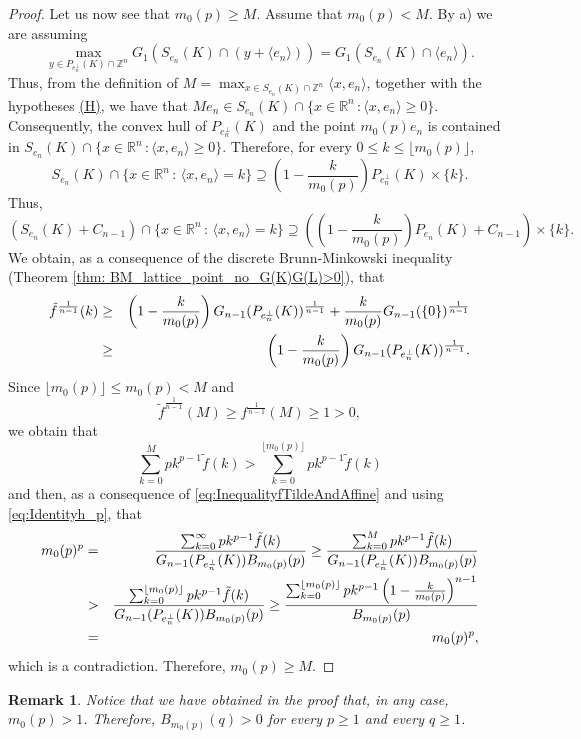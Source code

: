 \documentclass[10pt]{amsart}
\newtheorem{rmk}[thm]{Remark}
\def\R{\mathbb{R}}
\def\Z{\mathbb{Z}}
\numberwithin{equation}{section}
\begin{document}
\begin{proof}
Let us now see that $m_0(p)\geq M$. Assume that $m_0(p)<M$. By a) we are assuming
$$
\max_{y\in P_{e_n^\perp}(K)\cap\Z^n}G_1(S_{e_n}(K)\cap(y+\langle e_n\rangle))=G_1(S_{e_n}(K)\cap\langle e_n\rangle).
$$
Thus, from the definition of $\displaystyle{M=\max_{x\in S_{e_n}(K)\cap\Z^n}\langle x,e_n\rangle}$, together with the hypotheses \hyperlink{(H)}{\textrm{(H)}}, we have that $Me_n\in S_{e_n}(K)\cap\{x\in\R^n\,:\langle x,e_n\rangle\geq0\}$. Consequently, the convex hull of $P_{e_n^\perp}(K)$ and the point $m_0(p)e_n$  is contained in $S_{e_n}(K)\cap\{x\in\R^n\,:\langle x,e_n\rangle\geq0\}$. Therefore, for every $0\leq k\leq\lfloor m_0(p)\rfloor$,
$$
S_{e_n}(K)\cap\{x\in\R^n\,:\,\langle x,e_n\rangle=k\}\supseteq\left(1-\frac{k}{m_0(p)}\right)P_{e_n^\perp}(K)\times\{k\}.
$$
Thus,
$$
(S_{e_n}(K)+C_{n-1})\cap\{x\in\R^n\,:\,\langle x,e_n\rangle=k\}\supseteq\left(\left(1-\frac{k}{m_0(p)}\right)P_{e_n}(K)+C_{n-1}\right)\times\{k\}.
$$
We obtain, as a consequence of the discrete Brunn-Minkowski inequality (Theorem \ref{thm: BM_lattice_point_no_G(K)G(L)>0}), that
\begin{eqnarray}\label{eq:InequalityfTildeAndAffine}
\tilde{f}^\frac{1}{n-1}(k)&\geq&\left(1-\frac{k}{m_0(p)}\right)G_{n-1}(P_{e_n^\perp}(K))^\frac{1}{n-1}+\frac{k}{m_0(p)}G_{n-1}(\{0\})^\frac{1}{n-1}\cr
&\geq&\left(1-\frac{k}{m_0(p)}\right)G_{n-1}(P_{e_n^\perp}(K))^\frac{1}{n-1}.
\end{eqnarray}
Since $\lfloor m_0(p)\rfloor\leq m_0(p)<M$ and
$$
\tilde{f}^\frac{1}{n-1}(M)\geq f^\frac{1}{n-1}(M)\geq1>0,
$$
we obtain that
$$
\sum_{k=0}^{M}pk^{p-1}\tilde{f}(k)>\sum_{k=0}^{\lfloor m_0(p)\rfloor}pk^{p-1}\tilde{f}(k)
$$
and then, as a consequence of \eqref{eq:InequalityfTildeAndAffine} and using \eqref{eq:Identityh_p}, that
\begin{eqnarray*}
m_0(p)^p&=&\frac{\sum_{k=0}^{\infty}pk^{p-1}\tilde{f}(k)}{G_{n-1}(P_{e_n^\perp}(K))B_{m_0(p)}(p)}\geq\frac{\sum_{k=0}^{M}pk^{p-1}\tilde{f}(k)}{G_{n-1}(P_{e_n^\perp}(K))B_{m_0(p)}(p)}\cr
&>&\frac{\sum_{k=0}^{\lfloor m_0(p)\rfloor}pk^{p-1}\tilde{f}(k)}{G_{n-1}(P_{e_n^\perp}(K))B_{m_0(p)}(p)}\geq\frac{\sum_{k=0}^{\lfloor m_0(p)\rfloor}pk^{p-1}\left(1-\frac{k}{m_0(p)}\right)^{n-1}}{B_{m_0(p)}(p)}\cr
&=&m_0(p)^p,
\end{eqnarray*}
which is a contradiction. Therefore, $m_0(p)\geq M$.
\end{proof}

\begin{rmk}\label{rmk:m0(p)>1}
Notice that we have obtained in the proof that, in any case, $m_0(p)>1$. Therefore, $B_{m_0(p)}(q)>0$ for every $p\geq1$ and every $q\geq1$.
\end{rmk}
\end{document}
